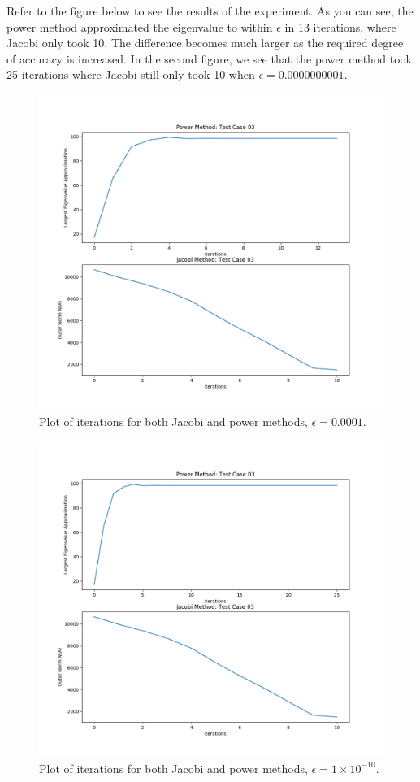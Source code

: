 \documentclass[12pt]{article}
\begin{document}
Refer to the figure below to see the results of the experiment. As you can see,
the power method approximated the eigenvalue to within $\epsilon$ in 13
iterations, where Jacobi only took 10. The difference becomes much larger as
the required degree of accuracy is increased. In the second figure, we see that
the power method took 25 iterations where Jacobi still only took 10 when
$\epsilon=0.0000000001$.
\begin{figure}[H]
  \includegraphics[width=6.5in]{figures/figure1.png}
  \caption{Plot of iterations for both Jacobi and power methods,
  $\epsilon=0.0001$.}
\centering
\end{figure}
\begin{figure}[H]
  \includegraphics[width=6.5in]{figures/figure2.png}
  \caption{Plot of iterations for both Jacobi and power methods,
  $\epsilon=1\times10^{-10}$.}
\centering
\end{figure}
\end{document}
